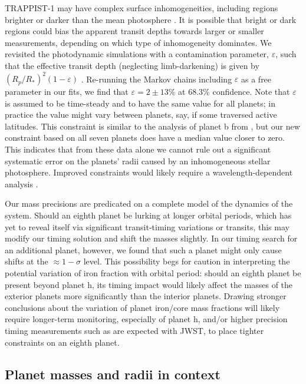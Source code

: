\documentclass[twocolumn]{aastex63}
\begin{document}
TRAPPIST-1 may have complex surface inhomogeneities, including regions brighter or darker than the mean photosphere  \citep{Morris2018d,Wakeford2019}. It is possible that bright or dark regions could bias the apparent transit depths towards larger or smaller measurements, depending on which type of inhomogeneity dominates. We revisited the photodynamic simulations with a contamination parameter,
$\varepsilon$, such that the effective transit depth (neglecting limb-darkening) is given by $(R_p/R_*)^2(1-\varepsilon)$ 
 \citep{Morris2018b,Morris2018c}.  Re-running the Markov chains 
including $\varepsilon$ as a free parameter in our fits, we
find that $\varepsilon = 2\pm 13$\% at 68.3\% confidence.  Note that $\varepsilon$ is assumed to be time-steady and to have the same value for all planets; in practice the value might vary between planets, say, if some traversed active latitudes.  
This constraint is similar to the analysis of planet b from \citet{Morris2018c}, but our new constraint based on all seven planets does have a median value closer to zero.
This indicates that from these data alone we cannot rule out a significant systematic error on the planets' radii caused by an inhomogeneous stellar photosphere.
Improved constraints would likely require a wavelength-dependent analysis \citep[e.g.][]{Rackham2018,Wakeford2019}.

Our mass precisions are predicated on a complete model of the dynamics of the system.  Should an eighth planet be lurking at longer orbital periods, which has yet to reveal itself via significant transit-timing variations or transits, this may modify our timing solution and shift the masses slightly.  In our timing search for an additional planet, however, we found that such a planet might only cause shifts at the ${\approx} 1{-}\sigma$ level.  This possibility begs for caution in interpreting the potential variation of iron fraction with orbital period:  should an eighth planet be present beyond planet h, its timing impact would likely affect the masses of the exterior planets more significantly than the interior planets.  Drawing stronger conclusions about the variation of planet iron/core mass fractions will likely require longer-term monitoring, especially of planet h, and/or higher precision timing measurements such as are expected with JWST, to place tighter constraints on an eighth planet.

\subsection{Planet masses and radii in context}
\end{document}
